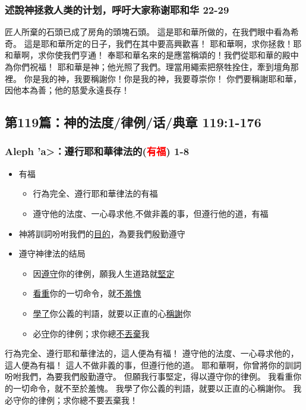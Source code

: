 \subsubsection{述說神拯救人类的计划，呼吁大家称谢耶和华 22-29}
匠人所棄的石頭已成了房角的頭塊石頭。
這是耶和華所做的，在我們眼中看為希奇。
這是耶和華所定的日子，我們在其中要高興歡喜！
耶和華啊，求你拯救！耶和華啊，求你使我們亨通！
奉耶和華名來的是應當稱頌的！我們從耶和華的殿中為你們祝福！
耶和華是神；他光照了我們。理當用繩索把祭牲拴住，牽到壇角那裡。
你是我的神，我要稱謝你！你是我的神，我要尊崇你！
你們要稱謝耶和華，因他本為善；他的慈愛永遠長存！

\subsection{第119篇：神的法度/律例/话/典章 119:1-176}


\subsubsection{Aleph \<'a>：遵行耶和華律法的(\textcolor{red}{有福}) 1-8}
\begin{itemize}
\itemsep-.45em
\item 有福
\begin{itemize}
\itemsep-.45em
\item 行為完全、遵行耶和華律法的有福
\item 遵守他的法度、一心尋求他,不做非義的事，但遵行他的道，有福
\end{itemize}
\item 神將訓詞吩咐我們的\underline{目的}，為要我們殷勤遵守
\item 遵守神律法的结局
\begin{itemize}
\itemsep-.45em
\item 因\underline{遵守}你的律例，願我人生道路就\underline{堅定}
\item \underline{看重}你的一切命令，就\underline{不羞愧}
\item \underline{學了}你公義的判語，就要以正直的心\underline{稱謝}你
\item 必\underline{守}你的律例；求你總\underline{不丟棄}我
\end{itemize}
\end{itemize}
行為完全、遵行耶和華律法的，這人便為有福！
遵守他的法度、一心尋求他的，這人便為有福！
這人不做非義的事，但遵行他的道。
耶和華啊，你曾將你的訓詞吩咐我們，為要我們殷勤遵守。
但願我行事堅定，得以遵守你的律例。
我看重你的一切命令，就不至於羞愧。
我學了你公義的判語，就要以正直的心稱謝你。
我必守你的律例；求你總不要丟棄我！

